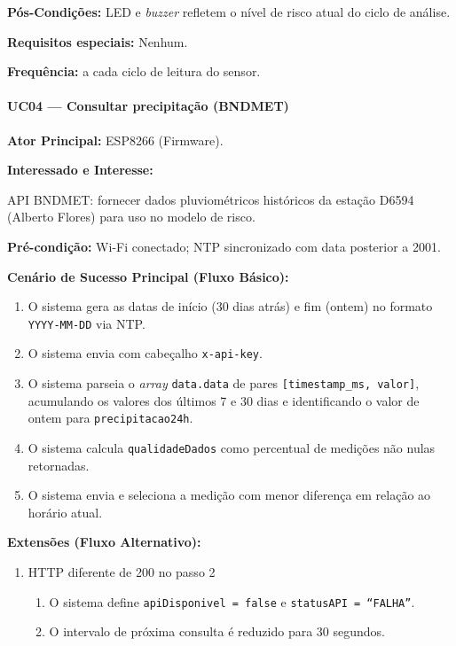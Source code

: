 \textbf{Pós-Condições:} LED e \textit{buzzer} refletem o nível
de risco atual do ciclo de análise.

\textbf{Requisitos especiais:} Nenhum.

\textbf{Frequência:} a cada ciclo de leitura do sensor.

\paragraph{UC04 --- Consultar precipitação (BNDMET)}\hfill\break

\textbf{Ator Principal:} ESP8266 (Firmware).

\textbf{Interessado e Interesse:}

API BNDMET: fornecer dados pluviométricos históricos da estação
D6594 (Alberto Flores) para uso no modelo de risco.

\textbf{Pré-condição:} Wi-Fi conectado; NTP sincronizado com
data posterior a 2001.

\textbf{Cenário de Sucesso Principal (Fluxo Básico):}
\begin{enumerate}
  \item O sistema gera as datas de início (30 dias atrás) e
        fim (ontem) no formato \texttt{YYYY-MM-DD} via NTP.
  \item O sistema envia
        com cabeçalho \texttt{x-api-key}.
  \item O sistema parseia o \textit{array} \texttt{data.data}
        de pares \texttt{[timestamp\_ms, valor]}, acumulando
        os valores dos últimos 7 e 30 dias e identificando
        o valor de ontem para \texttt{precipitacao24h}.
  \item O sistema calcula \texttt{qualidadeDados} como
        percentual de medições não nulas retornadas.
  \item O sistema envia
         e seleciona a medição com menor
        diferença em relação ao horário atual.
\end{enumerate}

\textbf{Extensões (Fluxo Alternativo):}

\begin{enumerate}
  \renewcommand{\theenumi}{2a}
  \renewcommand{\labelenumi}{\theenumi.}
  \item HTTP diferente de 200 no passo 2
  \begin{enumerate}
  \item O sistema define \texttt{apiDisponivel = false} e
        \texttt{statusAPI = ``FALHA''}.
  \item O intervalo de próxima consulta é reduzido para
        30 segundos.
  \end{enumerate}
\end{enumerate}

